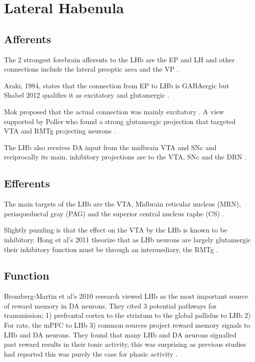 \documentclass[12pt,a4paper]{article}
\begin{document}
\section{Lateral Habenula}

\subsection{Afferents}

The 2 strongest forebrain afferents to the LHb are the EP and LH and other connections include the lateral preoptic area and the VP \citep{Parent1981}. 

Araki, 1984, states that the connection from EP to LHb is GABAergic \citep{Araki1984} but Shabel 2012 qualifies it as excitatory and glutamergic \citep{Shabel2012}.

Mok proposed that the actual connection was mainly excitatory \citep{Mok1974}. A view supported by Poller who found a strong glutamergic projection that targeted VTA and RMTg projecting neurons \citep{Poller2013}.

The LHb also receives DA input from the midbrain VTA and SNc \citep{Kowski2009} and reciprocally its main, inhibitory projections are to the VTA, SNc and the DRN \citep{Ji2007}\citep{Christoph1986}\citep{Rajakumar1993}.

\subsection{Efferents}

The main targets of the LHb are the VTA, Midbrain reticular nucleus (MRN), periaqueductal gray (PAG) and the superior central nucleus raphe (CS) \citep{Quina2015}.

Slightly puzzling is that the effect on the VTA by the LHb is known to be inhibitory. Hong et al’s 2011 theorize that as LHb neurons are largely glutamergic their inhibitory function must be through an intermediary, the RMTg \citep{Hong2011}.

\subsection{Function}

Bromberg-Martin et al’s 2010 research viewed LHb as the most important source of reward memory in DA neurons. They cited 3 potential pathways for transmission; 1) prefrontal cortex to the striatum to the global pallidus to LHb 2) For rats, the mPFC to LHb 3) common sources project reward memory signals to LHb and DA neurons. They found that many LHb and DA neurons signalled past reward results in their tonic activity, this was surprising as previous studies had reported this was purely the case for phasic activity \citep{Bromberg-Martin2010}.
\end{document}
